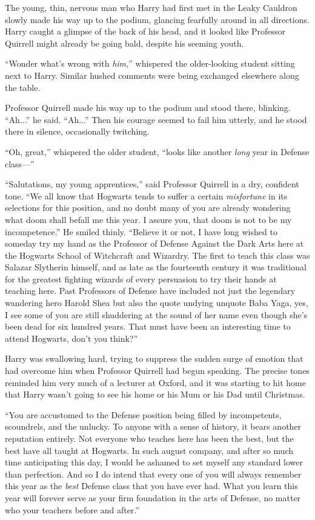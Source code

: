 The young, thin, nervous man who Harry had first met in the Leaky Cauldron slowly made his way up to the podium, glancing fearfully around in all directions. Harry caught a glimpse of the back of his head, and it looked like Professor Quirrell might already be going bald, despite his seeming youth.

“Wonder what’s wrong with \emph{him,}” whispered the older-looking student sitting next to Harry. Similar hushed comments were being exchanged elsewhere along the table.

Professor Quirrell made his way up to the podium and stood there, blinking. “Ah...” he said. “Ah...” Then his courage seemed to fail him utterly, and he stood there in silence, occasionally twitching.

“Oh, great,” whispered the older student, “looks like another \emph{long} year in Defense class—”

“Salutations, my young apprentices,” said Professor Quirrell in a dry, confident tone. “We all know that Hogwarts tends to suffer a certain \emph{misfortune} in its selections for this position, and no doubt many of you are already wondering what doom shall befall me this year. I assure you, that doom is not to be my incompetence.” He smiled thinly. “Believe it or not, I have long wished to someday try my hand as the Professor of Defense Against the Dark Arts here at the Hogwarts School of Witchcraft and Wizardry. The first to teach this class was Salazar Slytherin himself, and as late as the fourteenth century it was traditional for the greatest fighting wizards of every persuasion to try their hands at teaching here. Past Professors of Defense have included not just the legendary wandering hero Harold Shea but also the quote undying unquote Baba Yaga, yes, I see some of you are still shuddering at the sound of her name even though she’s been dead for six hundred years. That must have been an interesting time to attend Hogwarts, don’t you think?”

Harry was swallowing hard, trying to suppress the sudden surge of emotion that had overcome him when Professor Quirrell had begun speaking. The precise tones reminded him very much of a lecturer at Oxford, and it was starting to hit home that Harry wasn’t going to see his home or his Mum or his Dad until Christmas.

“You are accustomed to the Defense position being filled by incompetents, scoundrels, and the unlucky. To anyone with a sense of history, it bears another reputation entirely. Not everyone who teaches here has been the best, but the best have all taught at Hogwarts. In such august company, and after so much time anticipating this day, I would be ashamed to set myself any standard lower than perfection. And so I do intend that every one of you will always remember this year as the \emph{best} Defense class that you have ever had. What you learn this year will forever serve as your firm foundation in the arts of Defense, no matter who your teachers before and after.”

